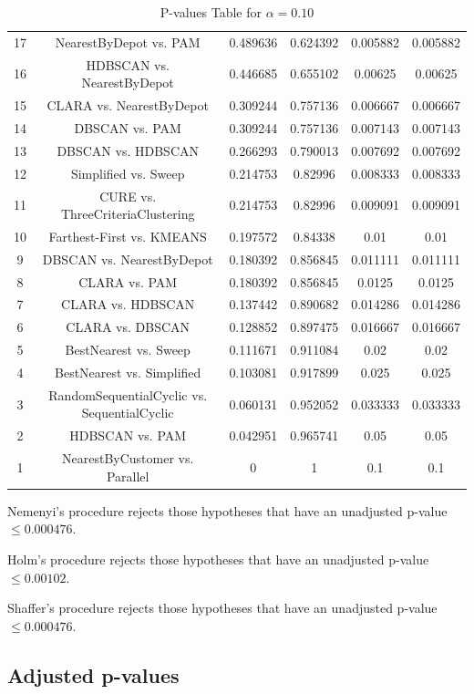 \documentclass[a4paper,10pt]{article}
\begin{document}
\begin{landscape}
\begin{table}[!htp]
\begin{tabular}{cccccc}
17&NearestByDepot vs. PAM&0.489636&0.624392&0.005882&0.005882\\
16&HDBSCAN vs. NearestByDepot&0.446685&0.655102&0.00625&0.00625\\
15&CLARA vs. NearestByDepot&0.309244&0.757136&0.006667&0.006667\\
14&DBSCAN vs. PAM&0.309244&0.757136&0.007143&0.007143\\
13&DBSCAN vs. HDBSCAN&0.266293&0.790013&0.007692&0.007692\\
12&Simplified vs. Sweep&0.214753&0.82996&0.008333&0.008333\\
11&CURE vs. ThreeCriteriaClustering&0.214753&0.82996&0.009091&0.009091\\
10&Farthest-First vs. KMEANS&0.197572&0.84338&0.01&0.01\\
9&DBSCAN vs. NearestByDepot&0.180392&0.856845&0.011111&0.011111\\
8&CLARA vs. PAM&0.180392&0.856845&0.0125&0.0125\\
7&CLARA vs. HDBSCAN&0.137442&0.890682&0.014286&0.014286\\
6&CLARA vs. DBSCAN&0.128852&0.897475&0.016667&0.016667\\
5&BestNearest vs. Sweep&0.111671&0.911084&0.02&0.02\\
4&BestNearest vs. Simplified&0.103081&0.917899&0.025&0.025\\
3&RandomSequentialCyclic vs. SequentialCyclic&0.060131&0.952052&0.033333&0.033333\\
2&HDBSCAN vs. PAM&0.042951&0.965741&0.05&0.05\\
1&NearestByCustomer vs. Parallel&0&1&0.1&0.1\\
\hline
\end{tabular}
\caption{P-values Table for $\alpha=0.10$}
\end{table}Nemenyi's procedure rejects those hypotheses that have an unadjusted p-value $\le0.000476$.

Holm's procedure rejects those hypotheses that have an unadjusted p-value $\le0.00102$.

Shaffer's procedure rejects those hypotheses that have an unadjusted p-value $\le0.000476$.

\pagebreak

\subsection{Adjusted p-values}


\end{landscape}
\end{document}
